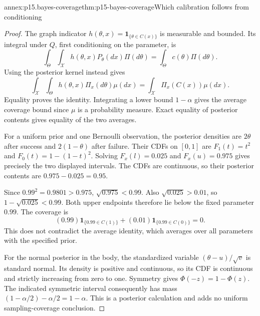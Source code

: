 \begin{annexitem}{annex:p15.bayes-coverage}{thm:p15-bayes-coverage}{Which calibration follows from conditioning}
\begin{proof}
The graph indicator \(h(\theta,x)=\mathbf1_{\{\theta\in C(x)\}}\)
is measurable and bounded. Its integral under \(Q\), first
conditioning on the parameter, is
\[
 \int_\Theta\int_{\mathcal X}h(\theta,x)P_\theta(dx)\Pi(d\theta)
                        =\int_\Theta c(\theta)\Pi(d\theta).
\]
Using the posterior kernel instead gives
\[
 \int_{\mathcal X}\int_\Theta h(\theta,x)\Pi_x(d\theta)\mu(dx)
                        =\int_{\mathcal X}\Pi_x(C(x))\mu(dx).
\]
Equality proves the identity. Integrating a lower bound
\(1-\alpha\) gives the average coverage bound since \(\mu\)
is a probability measure. Exact equality of posterior
contents gives equality of the two averages.

For a uniform prior and one Bernoulli observation, the
posterior densities are \(2\theta\) after success and
\(2(1-\theta)\) after failure. Their CDFs on \([0,1]\)
are \(F_1(t)=t^2\) and \(F_0(t)=1-(1-t)^2\).
Solving \(F_x(l)=0.025\) and \(F_x(u)=0.975\)
gives precisely the two displayed intervals. The CDFs
are continuous, so their posterior contents are
\(0.975-0.025=0.95\).

Since \(0.99^2=0.9801>0.975\),
\(\sqrt{0.975}<0.99\). Also
\(\sqrt{0.025}>0.01\), so
\(1-\sqrt{0.025}<0.99\).
Both upper endpoints therefore lie below the fixed
parameter \(0.99\). The coverage is
\[
 (0.99)\mathbf1_{\{0.99\in C(1)\}}
       +(0.01)\mathbf1_{\{0.99\in C(0)\}}=0.
\]
This does not contradict the average identity, which
averages over all parameters with the specified prior.

For the normal posterior in the body, the standardized
variable \((\theta-u)/\sqrt v\) is standard normal.
Its density is positive and continuous, so its CDF
is continuous and strictly increasing from zero to one.
Symmetry gives \(\Phi(-z)=1-\Phi(z)\).
The indicated symmetric interval consequently has mass
\((1-\alpha/2)-\alpha/2=1-\alpha\).
This is a posterior calculation and adds no uniform
sampling-coverage conclusion.
\end{proof}
\end{annexitem}

